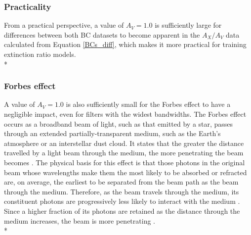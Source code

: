 \documentclass[12pt, a4paper]{report}
\begin{document}
\subsubsection{Practicality}
From a practical perspective, a value of $A_{V} = 1.0$ is sufficiently large for differences between both BC datasets to become apparent in the $A_{X}/A_{V}$ data calculated from Equation \ref{BCs_diff}, which makes it more practical for training extinction ratio models.\\*

\subsubsection{Forbes effect}
A value of $A_{V} = 1.0$ is also sufficiently small for the Forbes effect to have a negligible impact, even for filters with the widest bandwidths. The Forbes effect occurs as a broadband beam of light, such as that emitted by a star, passes through an extended partially-transparent medium, such as the Earth's atmosphere or an interstellar dust cloud. It states that the greater the distance travelled by a light beam through the medium, the more penetrating the beam becomes \citep{1842RSPT..132..225F}. The physical basis for this effect is that those photons in the original beam whose wavelengths make them the most likely to be absorbed or refracted are, on average, the earliest to be separated from the beam path as the beam through the medium. Therefore, as the beam travels through the medium, its constituent photons are progressively less likely to interact with the medium \citep{1995A&AS..109..293G}. Since a higher fraction of its photons are retained as the distance through the medium increases, the beam is more penetrating \citep{OHVRIL1999305}.\\*
\end{document}
